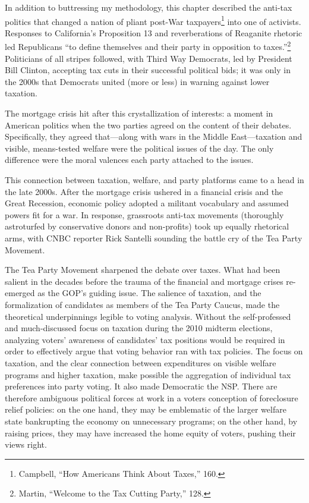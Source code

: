 \documentclass[12pt,oneside]{psthesis}
\begin{document}
In addition to buttressing my methodology, this chapter described the anti-tax politics that changed a nation of pliant post-War taxpayers\footnote{Campbell, ``How Americans Think About Taxes,'' 160.} into one of activists.
Responses to California's Proposition 13 and reverberations of Reaganite rhetoric led Republicans ``to define themselves and their party in opposition to taxes.''\footnote{Martin, ``Welcome to the Tax Cutting Party,'' 128.}
Politicians of all stripes followed, with Third Way Democrats, led by President Bill Clinton, accepting tax cuts in their successful political bids; it was only in the 2000s that Democrats united (more or less) in warning against lower taxation.

The mortgage crisis hit after this crystallization of interests: a moment in American politics when the two parties agreed on the content of their debates.
Specifically, they agreed that---along with wars in the Middle East---taxation and visible, means-tested welfare were the political issues of the day.
The only difference were the moral valences each party attached to the issues.

This connection between taxation, welfare, and party platforms came to a head in the late 2000s.
After the mortgage crisis ushered in a financial crisis and the Great Recession, economic policy adopted a militant vocabulary and assumed powers fit for a war.
In response, grassroots anti-tax movements (thoroughly astroturfed by conservative donors and non-profits) took up equally rhetorical arms, with CNBC reporter Rick Santelli sounding the battle cry of the Tea Party Movement.

The Tea Party Movement sharpened the debate over taxes.
What had been salient in the decades before the trauma of the financial and mortgage crises re-emerged as the GOP's guiding issue.
The salience of taxation, and the formalization of candidates as members of the Tea Party Caucus, made the theoretical underpinnings legible to voting analysis.
Without the self-professed and much-discussed focus on taxation during the 2010 midterm elections, analyzing voters' awareness of candidates' tax positions would be required in order to effectively argue that voting behavior ran with tax policies.
The focus on taxation, and the clear connection between expenditures on visible welfare programs and higher taxation, make possible the aggregation of individual tax preferences into party voting.
It also made Democratic the NSP.
There are therefore ambiguous political forces at work in a voters conception of foreclosure relief policies: on the one hand, they may be emblematic of the larger welfare state bankrupting the economy on unnecessary programs; on the other hand, by raising prices, they may have increased the home equity of voters, pushing their views right.
\end{document}
